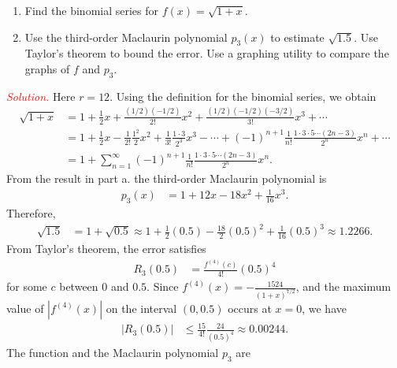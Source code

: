 \documentclass{report}
\begin{document}
    \pagebreak 
    \begin{exm}
        \bigbreak \noindent 
        \begin{enumerate}[label=(\alph*)]
            \item Find the binomial series for \( f(x) = \sqrt{1 + x} \).
            \item Use the third-order Maclaurin polynomial \( p_3(x) \) to estimate \( \sqrt{1.5} \). Use Taylor’s theorem to bound the error. Use a graphing utility to compare the graphs of \( f \) and \( p_3 \).
        \end{enumerate}
    \end{exm}
    \bigbreak \noindent 
    \textcolor{red}{\textit{Solution.}}
    Here \( r = 12 \).
    \bigbreak \noindent
    Using the definition for the binomial series, we obtain
    \begin{align*}
    \sqrt{1+x} &= 1 + \frac{1}{2}x + \frac{(1/2)(-1/2)}{2!}x^2 + \frac{(1/2)(-1/2)(-3/2)}{3!}x^3 + \cdots \\
    &= 1 + \frac{1}{2}x - \frac{1}{2!}\frac{1^2}{2}x^2 + \frac{1}{3!}\frac{1\cdot 3}{2^3}x^3 - \cdots + (-1)^{n+1}\frac{1}{n!}\frac{1\cdot 3 \cdot 5 \cdots (2n-3)}{2^n}x^n + \cdots \\
    &= 1 + \sum_{n=1}^{\infty} (-1)^{n+1}\frac{1}{n!}\frac{1\cdot 3 \cdot 5 \cdots (2n-3)}{2^n}x^n.
    \end{align*}
    \bigbreak \noindent 
    From the result in part a. the third-order Maclaurin polynomial is
    \begin{align*}
    p_3(x) &= 1 + 12x - 18x^2 + \frac{1}{16}x^3.
    \end{align*}
    \bigbreak
    \noindent Therefore,
    \begin{align*}
    \sqrt{1.5} &= 1 + \sqrt{0.5} \approx 1 + \frac{1}{2}(0.5) - \frac{18}{2}(0.5)^2 + \frac{1}{16}(0.5)^3 \approx 1.2266.
    \end{align*}
    \bigbreak
    \noindent From Taylor's theorem, the error satisfies
    \begin{align*}
    R_3(0.5) &= \frac{f^{(4)}(c)}{4!}(0.5)^4
    \end{align*}
    \bigbreak
    \noindent for some $c$ between $0$ and $0.5$. Since $f^{(4)}(x) = -\frac{1524}{(1+x)^{7/2}}$, and the maximum value of $\left| f^{(4)}(x) \right|$ on the interval $(0,0.5)$ occurs at $x=0$, we have
    \begin{align*}
    \left| R_3(0.5) \right| &\leq \frac{15}{4!}\frac{24}{(0.5)^4} \approx 0.00244.
    \end{align*}
    \bigbreak
    \noindent The function and the Maclaurin polynomial $p_3$ are
\end{document}
